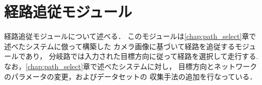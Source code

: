 \section{経路追従モジュール}
\label{sec:imitation}
経路追従モジュールについて述べる．
このモジュールは\ref{chap:path_select}章で述べたシステムに倣って構築した
カメラ画像に基づいて経路を追従するモジュールであり，
分岐路では入力された目標方向に従って経路を選択して走行する.
なお，\ref{chap:path_select}章で述べたシステムに対し，
目標方向とネットワークのパラメータの変更，およびデータセットの
収集手法の追加を行なっている．





